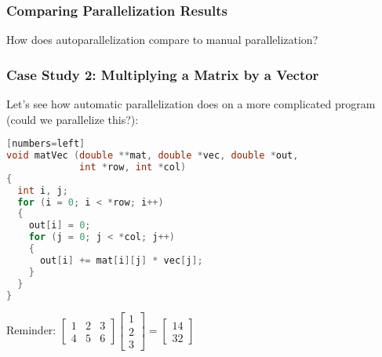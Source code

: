 \begin{frame}[fragile]
  \frametitle{Comparing Parallelization Results}


How does autoparallelization compare to manual parallelization?


\end{frame}



\begin{frame}[fragile]
  \frametitle{Case Study 2: Multiplying a Matrix by a Vector}


Let's see how automatic parallelization does on a more complicated
program (could we parallelize this?):

  \begin{lstlisting}[language=C][numbers=left]
void matVec (double **mat, double *vec, double *out,
             int *row, int *col) 
{
  int i, j;
  for (i = 0; i < *row; i++)
  {
    out[i] = 0;
    for (j = 0; j < *col; j++)
    {
      out[i] += mat[i][j] * vec[j];
    }
  }
}
  \end{lstlisting}


  \begin{center}
    Reminder:
    \begin{math}
      \begin{bmatrix} 1 & 2 & 3 \\ 4 & 5 & 6\end{bmatrix}
      \begin{bmatrix} 1 \\ 2 \\ 3 \end{bmatrix}
      =
      \begin{bmatrix} 14 \\ 32 \end{bmatrix}
    \end{math}
  \end{center}

\end{frame}


